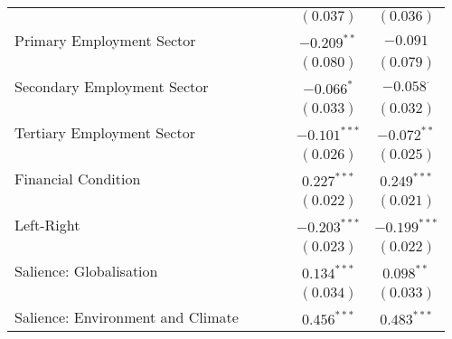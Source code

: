 \begin{center}
\begin{tiny}
\begin{longtable}{l@{} c@{} c@{} c@{} c@{} c@{}}
                                                      &                &                  &                & $(0.037)$        & $(0.036)$        \\
\quad Primary Employment Sector                       &                &                  &                & $-0.209^{**}$    & $-0.091$         \\
                                                      &                &                  &                & $(0.080)$        & $(0.079)$        \\
\quad Secondary Employment Sector                     &                &                  &                & $-0.066^{*}$     & $-0.058^{\cdot}$ \\
                                                      &                &                  &                & $(0.033)$        & $(0.032)$        \\
\quad Tertiary Employment Sector                      &                &                  &                & $-0.101^{***}$   & $-0.072^{**}$    \\
                                                      &                &                  &                & $(0.026)$        & $(0.025)$        \\
\quad Financial Condition                             &                &                  &                & $0.227^{***}$    & $0.249^{***}$    \\
                                                      &                &                  &                & $(0.022)$        & $(0.021)$        \\
\quad Left-Right                                      &                &                  &                & $-0.203^{***}$   & $-0.199^{***}$   \\
                                                      &                &                  &                & $(0.023)$        & $(0.022)$        \\
\quad Salience: Globalisation                         &                &                  &                & $0.134^{***}$    & $0.098^{**}$     \\
                                                      &                &                  &                & $(0.034)$        & $(0.033)$        \\
\quad Salience: Environment and Climate               &                &                  &                & $0.456^{***}$    & $0.483^{***}$    \\

\end{longtable}
\end{tiny}
\end{center}
